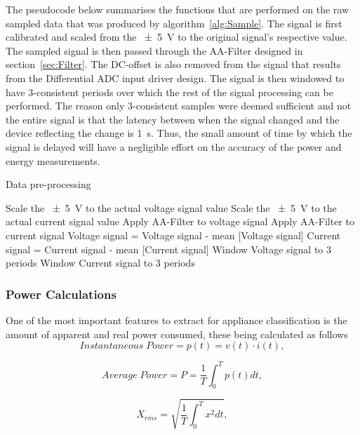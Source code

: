 The pseudocode below summarises the functions that are performed on the raw sampled data that was produced by algorithm~\ref{alg:Sample}. The signal is first calibrated and scaled from the \qty{\pm 5}{\volt} to the original signal's respective value. The sampled signal is then passed through the AA-Filter designed in section~\ref{sec:Filter}. The DC-offset is also removed from the signal that results from the Differential ADC input driver design. The signal is then windowed to have 3-consistent periods over which the rest of the signal processing can be performed. The reason only 3-consistent samples were deemed sufficient and not the entire signal is that the latency between when the signal changed and the device reflecting the change is \qty{1}{\second}. Thus, the small amount of time by which the signal is delayed will have a negligible effort on the accuracy of the power and energy measurements.  
\begin{algorithm}[H]
\caption{Data pre-processing}
\label{alg:Pre_Process}
\begin{algorithmic}
\State Scale the \qty{\pm 5}{\volt} to the actual voltage signal value  
\State Scale the \qty{\pm 5}{\volt} to the actual current signal value
\State Apply AA-Filter to voltage signal  
\State Apply AA-Filter to current signal
\State Voltage signal = Voltage signal - mean [Voltage signal]  
\State Current signal = Current signal - mean [Current signal]
\State Window Voltage signal to 3 periods 
\State Window Current signal to 3 periods 

\end{algorithmic}
\end{algorithm}

\subsubsection{Power Calculations}

One of the most important features to extract for appliance classification is the amount of apparent and real power consumed, these being calculated as follows
\begin{equation}
    Instantaneous \; Power  = p(t) = v(t) \cdot i(t) ,
    \label{eq:21}
\end{equation}

\begin{equation}
    Average \; Power  = P = \frac{1}{T} \int_{0}^{T} p(t) dt ,
    \label{eq:22}
\end{equation}

\begin{equation}
    X_{rms}  = \sqrt{\frac{1}{T} \int_{0}^{T} x^{2} dt },
    \label{eq:23}
\end{equation}

